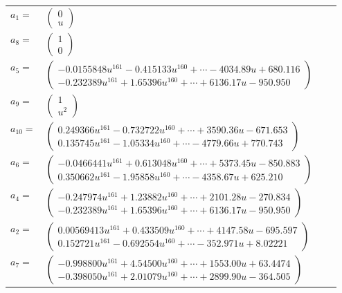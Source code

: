 \documentclass[1p]{elsarticle_modified}
\theoremstyle{definition}
\begin{document}
\begin{tabular}{m{7pt} m{180pt} m{7pt} m{180pt} }
\flushright $a_{1}=$&$\begin{pmatrix}0\\u\end{pmatrix}$ \\
\flushright $a_{8}=$&$\begin{pmatrix}1\\0\end{pmatrix}$ \\
\flushright $a_{5}=$&$\begin{pmatrix}-0.0155848 u^{161}-0.415133 u^{160}+\cdots-4034.89 u+680.116\\-0.232389 u^{161}+1.65396 u^{160}+\cdots+6136.17 u-950.950\end{pmatrix}$ \\
\flushright $a_{9}=$&$\begin{pmatrix}1\\u^2\end{pmatrix}$ \\
\flushright $a_{10}=$&$\begin{pmatrix}0.249366 u^{161}-0.732722 u^{160}+\cdots+3590.36 u-671.653\\0.135745 u^{161}-1.05334 u^{160}+\cdots-4779.66 u+770.743\end{pmatrix}$ \\
\flushright $a_{6}=$&$\begin{pmatrix}-0.0466441 u^{161}+0.613048 u^{160}+\cdots+5373.45 u-850.883\\0.350662 u^{161}-1.95858 u^{160}+\cdots-4358.67 u+625.210\end{pmatrix}$ \\
\flushright $a_{4}=$&$\begin{pmatrix}-0.247974 u^{161}+1.23882 u^{160}+\cdots+2101.28 u-270.834\\-0.232389 u^{161}+1.65396 u^{160}+\cdots+6136.17 u-950.950\end{pmatrix}$ \\
\flushright $a_{2}=$&$\begin{pmatrix}0.00569413 u^{161}+0.433509 u^{160}+\cdots+4147.58 u-695.597\\0.152721 u^{161}-0.692554 u^{160}+\cdots-352.971 u+8.02221\end{pmatrix}$ \\
\flushright $a_{7}=$&$\begin{pmatrix}-0.998800 u^{161}+4.54500 u^{160}+\cdots+1553.00 u+63.4474\\-0.398050 u^{161}+2.01079 u^{160}+\cdots+2899.90 u-364.505\end{pmatrix}$ \\

\end{tabular}
\end{document}
